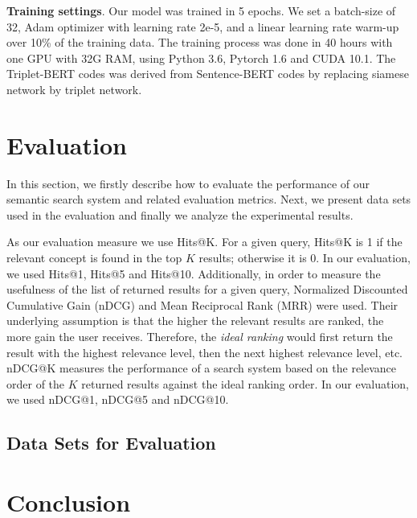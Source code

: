 \documentclass[preprint,12pt]{elsarticle}
\begin{document}
\textbf{Training settings}. Our model was trained in 5 epochs. We set a batch-size of 32, Adam optimizer with learning rate 2e-5, and a linear learning rate warm-up over 10\% of the training data. The training process was done in 40 hours with one GPU with 32G RAM, using Python 3.6, Pytorch 1.6 and CUDA 10.1. The Triplet-BERT codes was derived from Sentence-BERT \cite{Reimers2019} codes by replacing siamese network by triplet network.

\section*{Evaluation}
\label{sec:Evaluation}

In this section, we firstly describe how to evaluate the performance of our semantic search system and related evaluation metrics. Next, we present data sets used in the evaluation and finally we analyze the experimental results.

As our evaluation measure we use Hits@K. For a given query, Hits@K is 1 if the relevant concept is found in the top $K$ results; otherwise it is 0. In our evaluation, we used Hits@1, Hits@5 and Hits@10. Additionally, in order to measure the usefulness of the list of returned results for a given query, Normalized Discounted Cumulative Gain (nDCG) and Mean Reciprocal Rank (MRR) were used. Their underlying assumption is that the higher the relevant results are ranked, the more gain the user receives. Therefore, the \textit{ideal ranking} would first return the result with the highest relevance level, then the next highest relevance level, etc. nDCG@K measures the performance of a search system based on the relevance order of the $K$ returned results against the ideal ranking order. In our evaluation, we used nDCG@1, nDCG@5 and nDCG@10.

\subsection*{Data Sets for Evaluation}
\label{sec:DatasetEvaluation}

\section*{Conclusion}












\end{document}
